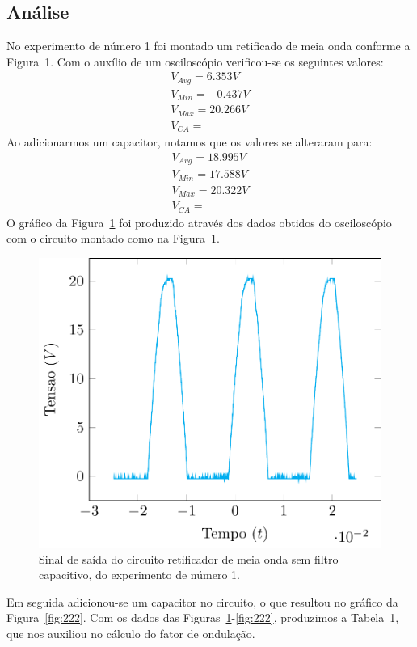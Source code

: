 \documentclass[12pt,a4paper]{article}
\begin{document}
\subsection{Análise}
No experimento de número 1 foi montado um retificado de meia onda conforme a Figura~1. Com o auxílio de um osciloscópio verificou-se os seguintes valores:
\begin{align*}
  V_{Avg} =6.353 V\\
  V_{Min} = -0.437 V \\
  V_{Max}= 20.266 V\\
  V_{CA} =
\end{align*}
Ao adicionarmos um capacitor, notamos que os valores se alteraram para:
\begin{align*}
  V_{Avg} =18.995 V\\
  V_{Min} = 17.588 V \\
  V_{Max}= 20.322 V\\
  V_{CA} =
\end{align*}
O gráfico da Figura~\ref{fig:221} foi produzido através dos dados obtidos do osciloscópio com o circuito montado como na Figura~1.
\begin{figure}[htpb]
  \centering
  \includegraphics[width=0.8\linewidth]{221.pdf}
  \caption{Sinal de saída do circuito retificador de meia onda sem filtro capacitivo, do experimento de número 1.}
  \label{fig:221}
\end{figure}
Em seguida adicionou-se um capacitor no circuito, o que resultou no gráfico da Figura~\ref{fig:222}. Com os dados das Figuras~\ref{fig:221}-\ref{fig:222}, produzimos a Tabela~1, que nos auxiliou no cálculo do fator de ondulação.
\end{document}
